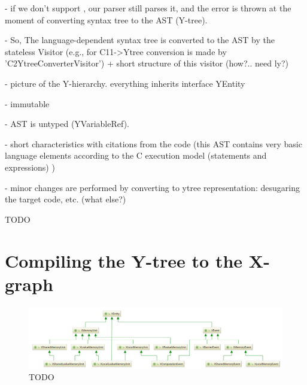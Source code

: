 
- if we don't support , our parser still parses it, and the error is thrown at the moment of converting syntax tree to the AST (Y-tree).

- So, The language-dependent syntax tree is converted to the AST by the stateless Visitor (e.g., for C11->Ytree conversion is made by 'C2YtreeConverterVisitor') + short structure of this visitor (how?.. need ly?)



- picture of the Y-hierarchy. everything inherits interface YEntity

- immutable

- AST is untyped (YVariableRef).

- short characteristics with citations from the code (this AST contains very basic language elements according to the C execution model (statements and expressions) )

- minor changes are performed by converting to ytree representation: desugaring the target code, etc. (what else?)



TODO


\section{Compiling the Y-tree to the X-graph}
\label{ch:impl:y2x}


\begin{figure}%
  \centering
  \includegraphics[width=\textwidth,height=\textheight,keepaspectratio]{img/my/class-diagrams/XEntity.png}
  \caption{TODO}
  \label{fig:class-diagrams:XEntity}
\end{figure}

